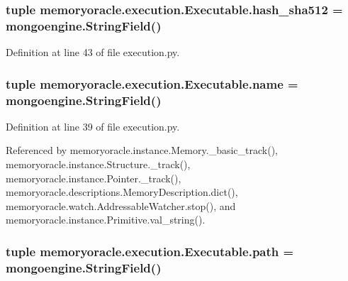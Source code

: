 \subsubsection[{hash\+\_\+sha512}]{\setlength{\rightskip}{0pt plus 5cm}tuple memoryoracle.\+execution.\+Executable.\+hash\+\_\+sha512 = mongoengine.\+String\+Field()\hspace{0.3cm}{\ttfamily [static]}}\label{classmemoryoracle_1_1execution_1_1Executable_afd44dfe3eb583f3c185b66a619e7923b}


Definition at line 43 of file execution.\+py.

\hypertarget{classmemoryoracle_1_1execution_1_1Executable_a52369e49bc4e8eea72149649accd2650}{}
\subsubsection[{name}]{\setlength{\rightskip}{0pt plus 5cm}tuple memoryoracle.\+execution.\+Executable.\+name = mongoengine.\+String\+Field()\hspace{0.3cm}{\ttfamily [static]}}\label{classmemoryoracle_1_1execution_1_1Executable_a52369e49bc4e8eea72149649accd2650}


Definition at line 39 of file execution.\+py.



Referenced by memoryoracle.\+instance.\+Memory.\+\_\+basic\+\_\+track(), memoryoracle.\+instance.\+Structure.\+\_\+track(), memoryoracle.\+instance.\+Pointer.\+\_\+track(), memoryoracle.\+descriptions.\+Memory\+Description.\+dict(), memoryoracle.\+watch.\+Addressable\+Watcher.\+stop(), and memoryoracle.\+instance.\+Primitive.\+val\+\_\+string().

\hypertarget{classmemoryoracle_1_1execution_1_1Executable_a783237790a0dde89a8d29c2c56983303}{}
\subsubsection[{path}]{\setlength{\rightskip}{0pt plus 5cm}tuple memoryoracle.\+execution.\+Executable.\+path = mongoengine.\+String\+Field()\hspace{0.3cm}{\ttfamily [static]}}\label{classmemoryoracle_1_1execution_1_1Executable_a783237790a0dde89a8d29c2c56983303}


